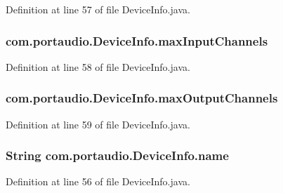 Definition at line 57 of file Device\+Info.\+java.

\subsubsection[{\texorpdfstring{max\+Input\+Channels}{maxInputChannels}}]{ com.\+portaudio.\+Device\+Info.\+max\+Input\+Channels}\hypertarget{classcom_1_1portaudio_1_1_device_info_a3f142c0507638c18b8d27215242b52ba}{}\label{classcom_1_1portaudio_1_1_device_info_a3f142c0507638c18b8d27215242b52ba}


Definition at line 58 of file Device\+Info.\+java.

\subsubsection[{\texorpdfstring{max\+Output\+Channels}{maxOutputChannels}}]{ com.\+portaudio.\+Device\+Info.\+max\+Output\+Channels}\hypertarget{classcom_1_1portaudio_1_1_device_info_a4e1e8f26ec3af7198cd11c4c6e2425d0}{}\label{classcom_1_1portaudio_1_1_device_info_a4e1e8f26ec3af7198cd11c4c6e2425d0}


Definition at line 59 of file Device\+Info.\+java.

\subsubsection[{\texorpdfstring{name}{name}}]{\setlength{\rightskip}{0pt plus 5cm}String com.\+portaudio.\+Device\+Info.\+name}\hypertarget{classcom_1_1portaudio_1_1_device_info_a806cc9c750deacab1880e058bb936c86}{}\label{classcom_1_1portaudio_1_1_device_info_a806cc9c750deacab1880e058bb936c86}


Definition at line 56 of file Device\+Info.\+java.

